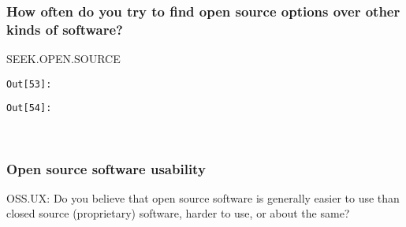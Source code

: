 \documentclass[11pt]{article}
\begin{document}
    \subsubsection{How often do you try to find open source options over
other kinds of
software?}\label{how-often-do-you-try-to-find-open-source-options-over-other-kinds-of-software}

SEEK.OPEN.SOURCE

\texttt{\color{outcolor}Out[{\color{outcolor}53}]:}
    

    

\texttt{\color{outcolor}Out[{\color{outcolor}54}]:}
    

    


    \begin{center}
    \end{center}
    { \hspace*{\fill} \\}
    
    \subsubsection{Open source software
usability}\label{open-source-software-usability}

OSS.UX: Do you believe that open source software is generally easier to
use than closed source (proprietary) software, harder to use, or about
the same?
\end{document}
